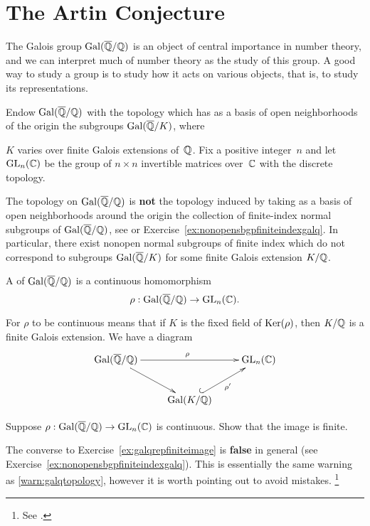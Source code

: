 \section{The Artin Conjecture}\label{sec:artin}

The Galois group $\operatorname{Gal}(\overline{\mathbb{Q}}/\mathbb{Q})$ is an object of central importance
in number theory, and we can interpret much of number theory as the
study of this group.  A good way to study a group is to study how it
acts on various objects, that is, to study its representations.

Endow $\operatorname{Gal}(\overline{\mathbb{Q}}/\mathbb{Q})$ with the topology which has as a basis of open neighborhoods
of the origin the subgroups $\operatorname{Gal}(\overline{\mathbb{Q}}/K)$, where~{$K$ varies
over finite Galois extensions of~$\mathbb{Q}$.
Fix a positive integer~$n$ and let $\operatorname{GL}_n(\mathbb{C})$ be the group of
$n\times n$ invertible matrices over~$\mathbb{C}$ with the discrete topology.

\begin{warning}\label{warn:galqtopology}
	The topology on $\operatorname{Gal}(\overline{\mathbb{Q}}/\mathbb{Q})$ is {\bf not} the topology induced
	by taking as a basis of open neighborhoods around the origin
	the collection of finite-index normal subgroups of $\operatorname{Gal}(\overline{\mathbb{Q}}/\mathbb{Q})$,
	see \cite[Ch.~7]{milne:FT} or
	Exercise~\ref{ex:nonopensbgpfiniteindexgalq}. In particular,
	there exist nonopen normal subgroups of finite index which
	do not correspond to subgroups $\operatorname{Gal}(\overline{\mathbb{Q}}/K)$ for some
	finite Galois extension $K/\mathbb{Q}$.
\end{warning}

\begin{definition}
A  of $\operatorname{Gal}(\overline{\mathbb{Q}}/\mathbb{Q})$
is a continuous homomorphism
$$
  \rho:\operatorname{Gal}(\overline{\mathbb{Q}}/\mathbb{Q})\to \operatorname{GL}_n(\mathbb{C}).
$$
\end{definition}
For $\rho$ to be continuous means that if $K$ is the fixed
field of $\operatorname{Ker}(\rho)$, then $K/\mathbb{Q}$ is a finite Galois extension.  We have
a diagram
$$\xymatrix{ {\galq}\ar[rr]^{\rho}\ar[dr]& &{\GL_n(\C)}\\
&{\Gal(K/\Q)}\ar@{^{(}->}[ur]_{\rho'}}
$$

\begin{exercise}\label{ex:galqrepfiniteimage}
	Suppose $\rho:\operatorname{Gal}(\overline{\mathbb{Q}}/\mathbb{Q})\to\operatorname{GL}_n(\mathbb{C})$ is continuous.
	Show that the image is finite.
\end{exercise}

\begin{remark}
	The converse to Exercise~\ref{ex:galqrepfiniteimage}
	is \textbf{false} in general (see
	Exercise~\ref{ex:nonopensbgpfiniteindexgalq}).
	This is essentially the same warning as
	\ref{warn:galqtopology}, however it is worth
	pointing out to avoid mistakes.
	\footnote{See \cite[pg.~1]{artinconjectureLectureNotes}.}
\end{remark}

}
